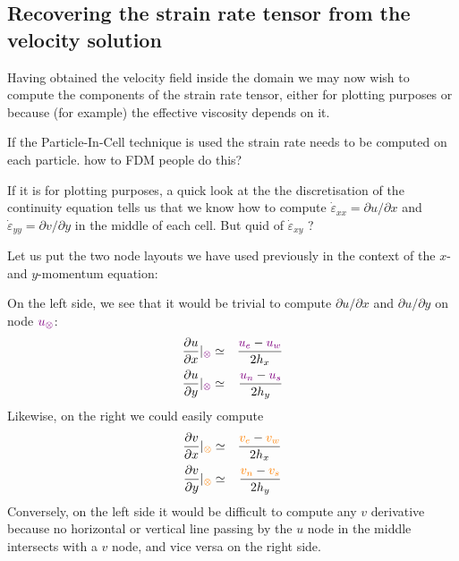 \newpage
\subsection{Recovering the strain rate tensor from the velocity solution}

Having obtained the velocity field inside the domain we may now 
wish to compute the components of the strain rate tensor, either
for plotting purposes or because (for example) the effective viscosity 
depends on it.

If the Particle-In-Cell technique is used the strain rate needs to 
be computed on each particle. 
{\color{red} how to FDM people do this?}

If it is for plotting purposes, a quick look 
at the the discretisation of the continuity equation tells us that
we know how to compute 
$\dot{\varepsilon}_{xx}=\partial u/ \partial x$ and
$\dot{\varepsilon}_{yy}=\partial v/ \partial y$ in the middle of each cell. 
But quid of $\dot{\varepsilon}_{xy}$ ?

Let us put the two node layouts we have used previously 
in the context of the $x$- and $y$-momentum equation:

\begin{multicols}{2}



\columnbreak



\end{multicols}

On the left side, we see that it would be trivial to compute $\partial u/\partial x$
and $\partial u/\partial y$ on node ${\color{violet} u_\otimes}$:
\begin{eqnarray}
\frac{\partial u}{\partial x} |_{\color{violet}\otimes}
&\simeq&  \frac{ {\color{violet} u_e}-{\color{violet} u_w}  }{2h_x} \nonumber\\
\frac{\partial u}{\partial y} |_{\color{violet}\otimes}
&\simeq&  \frac{ {\color{violet} u_n}-{\color{violet} u_s}  }{2h_y} \nonumber
\end{eqnarray}
Likewise, on the right we could easily compute
\begin{eqnarray}
\frac{\partial v}{\partial x} |_{\color{orange}\otimes}
&\simeq&  \frac{ {\color{orange} v_e}-{\color{orange} v_w}  }{2h_x} \nonumber\\
\frac{\partial v}{\partial y} |_{\color{orange}\otimes}
&\simeq&  \frac{ {\color{orange} v_n}-{\color{orange} v_s}  }{2h_y} \nonumber
\end{eqnarray}
Conversely, on the left side it would be difficult to 
compute any $v$ derivative because no horizontal or vertical 
line passing by the $u$ node in the middle intersects with a 
$v$ node, and vice versa on the right side. 

